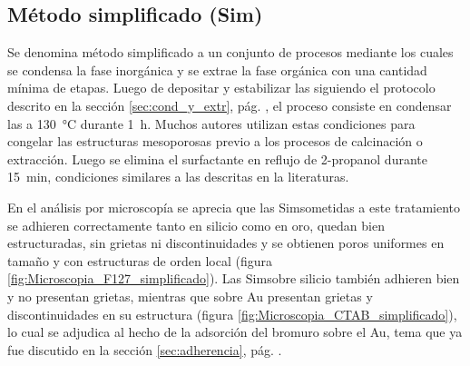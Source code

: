 	\subsection{Método simplificado (Sim)}

	 		Se denomina método simplificado a un conjunto de procesos mediante los cuales se condensa la fase inorgánica y se extrae la fase orgánica con una cantidad mínima de etapas. Luego de depositar y estabilizar las \pdm\space siguiendo el protocolo descrito en la sección \ref{sec:cond_y_extr}, pág. \pageref{sec:cond_y_extr}, el proceso consiste en condensar las \pdm\space a \SI{130}{\celsius} durante \SI{1}{\hour}. Muchos autores utilizan estas condiciones para congelar las estructuras mesoporosas previo a los procesos de calcinación o extracción. \cite{Crepaldi2003,Crepaldi2002a,Soler-Illia2006} Luego se elimina el surfactante en reflujo de 2-propanol durante \SI{15}{\minute}, condiciones similares a las descritas en la literaturas. \cite{Angelome2008,Calvo20210,Calvo2010,Fuertes2009,brunsen2011,Calvo2009}
			
			En el análisis por microscopía se aprecia que las Sim\pdmF\space sometidas a este tratamiento se adhieren correctamente tanto en silicio como en oro, quedan bien estructuradas, sin grietas ni discontinuidades y se obtienen poros uniformes en tamaño y con estructuras de orden local (figura \ref{fig:Microscopia_F127_simplificado}). Las Sim\pdmC\space sobre silicio también adhieren bien y no presentan grietas, mientras que sobre Au presentan grietas y discontinuidades en su estructura (figura \ref{fig:Microscopia_CTAB_simplificado}), lo cual se adjudica al hecho de la adsorción del bromuro sobre el Au, tema que ya fue discutido en la sección \ref{sec:adherencia}, pág. \pageref{sec:adherencia}. 
			
